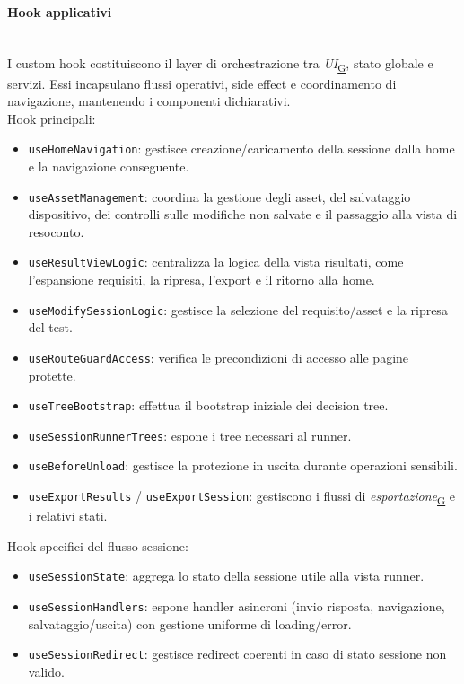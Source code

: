 \documentclass[a4paper,12pt]{article}
\begin{document}
            \paragraph{Hook applicativi}\mbox{}\\
                I custom hook costituiscono il layer di orchestrazione tra \textit{UI}\textsubscript{\href{https://atlasteam9.github.io/Atlas/glossario.html\#UI}{G}}, stato globale e servizi. Essi incapsulano flussi operativi, side effect e coordinamento di navigazione, mantenendo i componenti dichiarativi. \\
                Hook principali:
                \begin{itemize}
                    \item \texttt{useHomeNavigation}: gestisce creazione/caricamento della sessione dalla home e la navigazione conseguente.
                    \item \texttt{useAssetManagement}: coordina la gestione degli asset, del salvataggio dispositivo, dei controlli sulle modifiche non salvate e il passaggio alla vista di resoconto.
                    \item \texttt{useResultViewLogic}: centralizza la logica della vista risultati, come l'espansione requisiti, la ripresa, l'export e il ritorno alla home.
                    \item \texttt{useModifySessionLogic}: gestisce la selezione del requisito/asset e la ripresa del test.
                    \item \texttt{useRouteGuardAccess}: verifica le precondizioni di accesso alle pagine protette.
                    \item \texttt{useTreeBootstrap}: effettua il bootstrap iniziale dei decision tree.
                    \item \texttt{useSessionRunnerTrees}: espone i tree necessari al runner.
                    \item \texttt{useBeforeUnload}: gestisce la protezione in uscita durante operazioni sensibili.
                    \item \texttt{useExportResults} / \texttt{useExportSession}: gestiscono i flussi di \textit{esportazione}\textsubscript{\href{https://atlasteam9.github.io/Atlas/glossario.html\#Esportazione}{G}} e i relativi stati.
                \end{itemize}
                Hook specifici del flusso sessione:
                \begin{itemize}
                    \item \texttt{useSessionState}: aggrega lo stato della sessione utile alla vista runner.
                    \item \texttt{useSessionHandlers}: espone handler asincroni (invio risposta, navigazione, salvataggio/uscita) con gestione uniforme di loading/error.
                    \item \texttt{useSessionRedirect}: gestisce redirect coerenti in caso di stato sessione non valido.
                \end{itemize}
        
\end{document}
